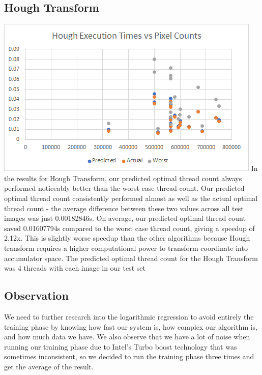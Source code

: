 \documentclass{article}
\begin{document}
    \subsection{Hough Transform}
    \includegraphics[width=\textwidth]{source/images/hugh_transform.png}
    In the results for Hough Transform, our predicted optimal thread count always performed noticeably better than the worst case thread count. Our predicted optimal thread count consistently performed almost as well as the actual optimal thread count - the average difference between these two values across all test images was just 0.00182846s. On average, our predicted optimal thread count saved 0.01607794s compared to the worst case thread count, giving a speedup of 2.12x. This is slightly worse speedup than the other algorithms because Hough transform requires a higher computational power to transform coordinate into accumulator space. The predicted optimal thread count for the Hough Transform was 4 threads with each image in our test set
    
    \subsection{Observation}
    We need to further research into the logarithmic regression to avoid entirely the training phase by knowing how fast our system is, how complex our algorithm is, and how much data we have. We also observe that we have a lot of noise when running our training phase due to Intel's Turbo boost technology that was sometimes inconsistent, so we decided to run the training phase three times and get the average of the result.
\end{document}
